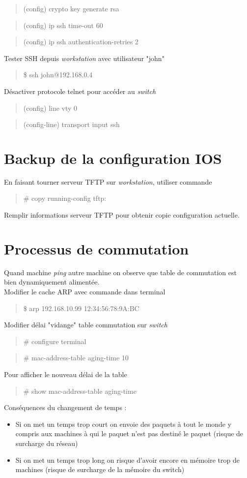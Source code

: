 \documentclass[a4paper, 11pt]{article}
\newcommand{\commande}[1] {
    \begin{quote}
    \tt\raggedright #1
    \end{quote}
}
\begin{document}
\commande{(config) crypto key generate rsa}
\commande{(config) ip ssh time-out 60}
\commande{(config) ip ssh authentication-retries 2}

Tester SSH depuis \textit{workstation} avec utilisateur "john"

\commande{\$ ssh john@192.168.0.4} 

Désactiver protocole telnet pour accéder au \textit{switch}

\commande{(config) line vty 0}
\commande{(config-line) transport input ssh}

\section{Backup de la configuration IOS}

En faisant tourner serveur TFTP sur \textit{workstation}, utiliser commande

\commande{\# copy running-config tftp:}

Remplir informations serveur TFTP pour obtenir copie configuration actuelle.

\section{Processus de commutation}

Quand machine \textit{ping} autre machine on observe que table de commutation est bien dynamiquement alimentée.
\\

Modifier le cache ARP avec commande dans terminal

\commande{\$ arp 192.168.10.99 12:34:56:78:9A:BC}

Modifier délai "vidange" table commutation sur \textit{switch}

\commande{\# configure terminal}
\commande{\# mac-address-table aging-time 10}

Pour afficher le nouveau délai de la table

\commande{# show mac-address-table aging-time}

Conséquences du changement de temps :

\begin{itemize}
\item Si on met un temps trop court on envoie des paquets à tout le monde  y compris aux machines à qui le paquet n’est pas destiné le paquet (risque de surcharge du réseau)
\item Si on met un temps trop long on risque d’avoir encore en mémoire trop de machines  (risque de surcharge de la mémoire du switch)
\\
\end{itemize}
\end{document}
